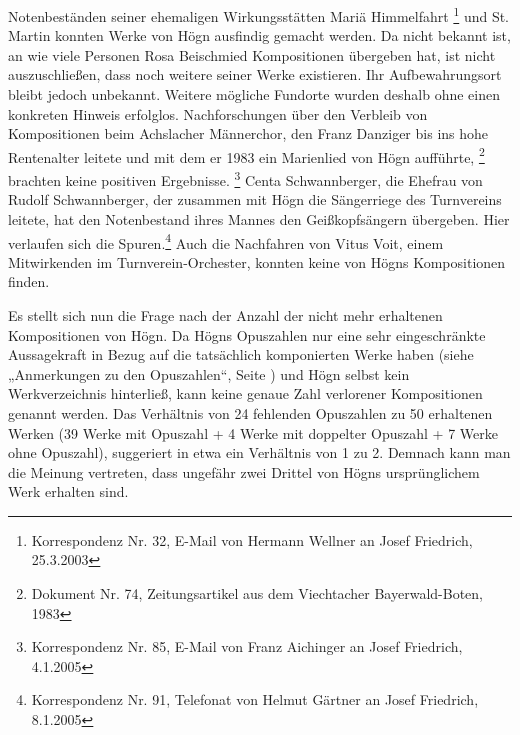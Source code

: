 Notenbeständen seiner ehemaligen Wirkungsstätten Mariä
Himmelfahrt \footnote{Korrespondenz Nr. 32, E-Mail von Hermann Wellner
an Josef Friedrich, 25.3.2003} und St. Martin konnten Werke von Högn
ausfindig gemacht werden. Da nicht bekannt ist, an wie viele Personen
Rosa Beischmied Kompositionen übergeben hat, ist nicht auszuschließen,
dass noch weitere seiner Werke existieren. Ihr Aufbewahrungsort bleibt
jedoch unbekannt. Weitere mögliche Fundorte wurden deshalb ohne einen
konkreten Hinweis erfolglos. Nachforschungen über den Verbleib von
Kompositionen beim Achslacher Männerchor, den Franz Danziger bis ins
hohe Rentenalter leitete und mit dem er 1983 ein Marienlied von Högn
aufführte, \footnote{Dokument Nr. 74, Zeitungsartikel aus dem
Viechtacher Bayerwald-Boten, 1983} brachten keine positiven
Ergebnisse. \footnote{Korrespondenz Nr. 85, E-Mail von Franz Aichinger
an Josef Friedrich, 4.1.2005} Centa Schwannberger, die Ehefrau von
Rudolf Schwannberger, der zusammen mit Högn die Sängerriege des
Turnvereins leitete, hat den Notenbestand ihres Mannes den
Geißkopfsängern übergeben. Hier verlaufen sich die Spuren.\footnote{
Korrespondenz Nr. 91, Telefonat von Helmut Gärtner an Josef Friedrich,
8.1.2005} Auch die Nachfahren von Vitus Voit, einem Mitwirkenden im
Turnverein-Orchester, konnten keine von Högns Kompositionen finden.

Es stellt sich nun die Frage nach der Anzahl der nicht mehr erhaltenen
Kompositionen von Högn. Da Högns Opuszahlen nur eine sehr
eingeschränkte Aussagekraft in Bezug auf die tatsächlich komponierten
Werke haben (siehe  „Anmerkungen zu den
Opuszahlen“, Seite ) und Högn selbst kein
Werkverzeichnis hinterließ, kann keine genaue Zahl verlorener
Kompositionen genannt werden. Das Verhältnis von 24 fehlenden
Opuszahlen zu 50 erhaltenen Werken (39 Werke mit Opuszahl + 4 Werke mit
doppelter Opuszahl + 7 Werke ohne Opuszahl), suggeriert in etwa ein
Verhältnis von 1 zu 2. Demnach kann man die Meinung vertreten, dass
ungefähr zwei Drittel von Högns ursprünglichem Werk erhalten sind.

